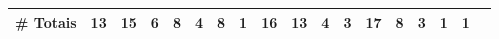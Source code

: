 \begin{table*}[t]
\begin{tabular}{@{}lcccccccccccccccccc@{}}
\multicolumn{2}{r}{\textbf{\# Totais}}			& 	\multicolumn{1}{c}{13} 	& \multicolumn{1}{c}{15} 	& \multicolumn{1}{c}{6} 	& \multicolumn{1}{c}{8} 	& \multicolumn{1}{c}{4} 	& \multicolumn{1}{c}{8} 	& \multicolumn{1}{c}{1} 	& \multicolumn{1}{c}{16} 	& \multicolumn{1}{c}{13} 	& \multicolumn{1}{c}{4} 	& \multicolumn{1}{c}{3} 	& \multicolumn{1}{c}{17} 	& \multicolumn{1}{c}{8} 	& \multicolumn{1}{c}{3} 	& \multicolumn{1}{c}{1} 	& \multicolumn{1}{c}{1} 	& \multicolumn{1}{c}{} 		& 	\\

\toprule
\end{tabular}
\label{tab:Categories}
\end{table*}


